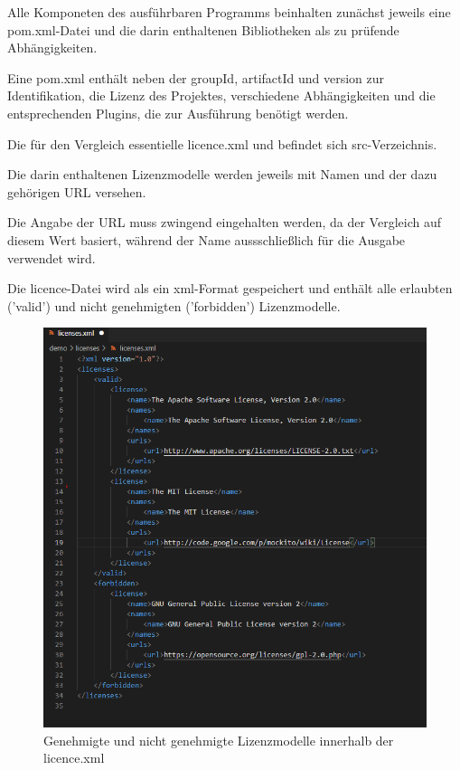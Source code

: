 Alle Komponeten des ausführbaren Programms beinhalten zunächst jeweils eine pom.xml-Datei und die darin enthaltenen Bibliotheken als zu prüfende Abhängigkeiten. 

Eine pom.xml enthält neben der groupId, artifactId und version zur Identifikation, die Lizenz des Projektes, verschiedene Abhängigkeiten und die entsprechenden Plugins, die zur Ausführung benötigt werden.  

Die für den Vergleich essentielle licence.xml und befindet sich src-Verzeichnis.  

Die darin enthaltenen Lizenzmodelle werden jeweils mit Namen und der dazu gehörigen URL versehen. 

Die Angabe der URL muss zwingend eingehalten werden, da der Vergleich auf diesem Wert basiert, während der Name aussschließlich für die Ausgabe verwendet wird. 

Die licence-Datei wird als ein xml-Format gespeichert und enthält alle erlaubten ('valid') und nicht genehmigten ('forbidden') Lizenzmodelle. 

\begin{figure}[h]
    \centering
    \includegraphics[scale=0.45]{Bilder/licencesxml.png}
    \caption{Genehmigte und nicht genehmigte Lizenzmodelle innerhalb der licence.xml}
\end{figure}

